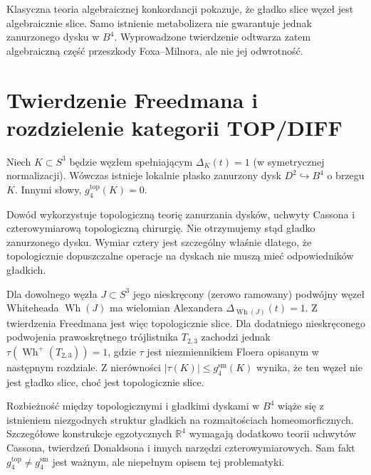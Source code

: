 \begin{uwaga}
Klasyczna teoria algebraicznej konkordancji pokazuje,
że gładko slice węzeł jest algebraicznie slice.
Samo istnienie metabolizera nie gwarantuje jednak
zanurzonego dysku w $B^4$. Wyprowadzone twierdzenie
odtwarza zatem algebraiczną część przeszkody Foxa--Milnora,
ale nie jej odwrotność.
\end{uwaga}


\section{Twierdzenie Freedmana i rozdzielenie kategorii TOP/DIFF}
\label{sec:kt-freedman}

\begin{twierdzenie}
Niech $K\subset S^3$ będzie węzłem spełniającym
$\Delta_K(t)=1$ (w symetrycznej normalizacji).
Wówczas istnieje lokalnie płasko zanurzony dysk
$D^2\hookrightarrow B^4$ o brzegu $K$. Innymi słowy,
$g_4^{\mathrm{top}}(K)=0$.
\end{twierdzenie}

\begin{uwaga}
Dowód wykorzystuje topologiczną teorię zanurzania dysków,
uchwyty Cassona i czterowymiarową topologiczną chirurgię.
Nie otrzymujemy stąd gładko zanurzonego dysku. Wymiar
cztery jest szczególny właśnie dlatego, że topologicznie
dopuszczalne operacje na dyskach nie muszą mieć odpowiedników
gładkich.
\end{uwaga}

\begin{przyklad}
Dla dowolnego węzła $J\subset S^3$ jego nieskręcony
(zerowo ramowany) podwójny węzeł Whiteheada $\operatorname{Wh}(J)$
ma wielomian Alexandera $\Delta_{\operatorname{Wh}(J)}(t)=1$.
Z twierdzenia Freedmana jest więc topologicznie slice.
Dla dodatniego nieskręconego podwojenia prawoskrętnego
trójlistnika $T_{2,3}$ zachodzi jednak
$\tau(\operatorname{Wh}^{+}(T_{2,3}))=1$,
gdzie $\tau$ jest niezmiennikiem Floera opisanym w następnym
rozdziale. Z nierówności $|\tau(K)|\leq g_4^{\mathrm{sm}}(K)$
wynika, że ten węzeł nie jest gładko slice, choć jest
topologicznie slice.
\end{przyklad}

\begin{uwaga}
Rozbieżność między topologicznymi i gładkimi dyskami
w $B^4$ wiąże się z istnieniem niezgodnych struktur
gładkich na rozmaitościach homeomorficznych.
Szczegółowe konstrukcje egzotycznych $\mathbb R^4$
wymagają dodatkowo teorii uchwytów Cassona, twierdzeń
Donaldsona i innych narzędzi czterowymiarowych.
Sam fakt $g_4^{\mathrm{top}}\ne g_4^{\mathrm{sm}}$
jest ważnym, ale niepełnym opisem tej problematyki.
\end{uwaga}

